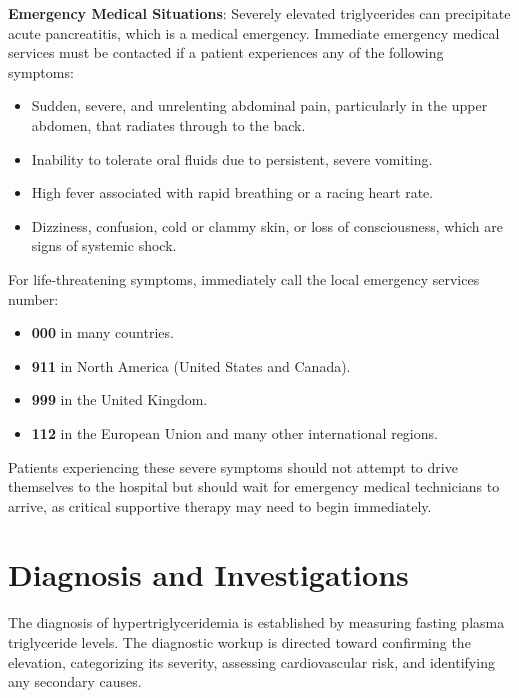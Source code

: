 \textbf{Emergency Medical Situations}:
Severely elevated triglycerides can precipitate acute pancreatitis, which is a medical emergency. Immediate emergency medical services must be contacted if a patient experiences any of the following symptoms:
\begin{itemize}
    \item Sudden, severe, and unrelenting abdominal pain, particularly in the upper abdomen, that radiates through to the back.
    \item Inability to tolerate oral fluids due to persistent, severe vomiting.
    \item High fever associated with rapid breathing or a racing heart rate.
    \item Dizziness, confusion, cold or clammy skin, or loss of consciousness, which are signs of systemic shock.
\end{itemize}

For life-threatening symptoms, immediately call the local emergency services number:
\begin{itemize}
    \item \textbf{000} in many countries.
    \item \textbf{911} in North America (United States and Canada).
    \item \textbf{999} in the United Kingdom.
    \item \textbf{112} in the European Union and many other international regions.
\end{itemize}
Patients experiencing these severe symptoms should not attempt to drive themselves to the hospital but should wait for emergency medical technicians to arrive, as critical supportive therapy may need to begin immediately.

\section*{Diagnosis and Investigations}
The diagnosis of hypertriglyceridemia is established by measuring fasting plasma triglyceride levels. The diagnostic workup is directed toward confirming the elevation, categorizing its severity, assessing cardiovascular risk, and identifying any secondary causes.

